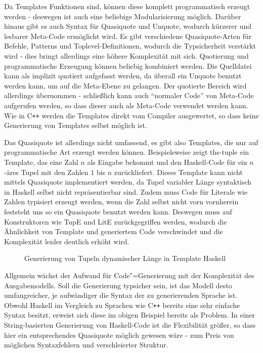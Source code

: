 \documentclass[11pt, a4paper, bibgerm]{book}
\newcommand\abb{}
\newcommand{\cgen}{Code"=Generierung}
\newcommand{\cpp}{C\texttt{++}}
\begin{document}
Da Templates Funktionen sind, können diese komplett programmatisch
erzeugt werden - deswegen ist auch eine beliebige Modularisierung
möglich. Darüber hinaus gibt es auch Syntax für Quasiquote und Unquote,
wodurch kürzerer und lesbarer Meta-Code ermöglicht wird. Es gibt
verschiedene Quasiquote-Arten für Befehle, Patterns und
Toplevel-Definitionen, wodurch die Typsicherheit verstärkt wird - dies
bringt allerdings eine höhere Komplexität mit sich. Quotierung und
programmatische Erzeugung können beliebig kombiniert werden. Die
Quelldatei kann als implizit quotiert aufgefasst werden, da überall ein
Unquote benutzt werden kann, um auf die Meta-Ebene zu gelangen. Der
quotierte Bereich wird allerdings übernommen - schließlich kann auch
"`normaler Code"' von Meta-Code aufgerufen werden, so dass dieser auch
als Meta-Code verwendet werden kann. Wie in \cpp{} werden die Templates
direkt vom Compiler ausgewertet, so dass keine Generierung von Templates
selbst möglich ist.

Das Quasiquote ist allerdings nicht umfassend, es gibt also Templates, die
nur auf programmatische Art erzeugt werden können. Beispielsweise zeigt
\abb{ths-tuple} ein Template, das eine Zahl $n$ als Eingabe bekommt und
den Haskell-Code für ein $n$-äres Tupel mit den Zahlen $1$ bis $n$
zurückliefert. Dieses Template kann nicht mittels Quasiquote implementiert
werden, da Tupel variabler Länge syntaktisch in Haskell selbst nicht
repräsentierbar sind. Zudem muss Code für Literale wie Zahlen typisiert
erzeugt werden, wenn die Zahl selbst nicht vorn vornherein feststeht uns
so ein Quasiquote benutzt werden kann. Deswegen muss auf Konstruktoren wie
TupE und LitE zurückgegriffen werden, wodurch die Ähnlichkeit von
Template und generiertem Code verschwindet und die Komplexität leider
deutlich erhöht wird.

\begin{figure}
  \centering
  \caption{Generierung von Tupeln dynamischer Länge in Template Haskell}
  \label{magicl:fig:ths-tuple}
\end{figure}

Allgemein wächst der Aufwand für \cgen{} mit der Komplexität des
Ausgabemodells. Soll die Generierung typsicher sein, ist das Modell
desto umfangreicher, je aufwändiger die Syntax der zu generierenden
Sprache ist. Obwohl Haskell im Vergleich zu Sprachen wie \cpp{} bereits
eine sehr einfache Syntax besitzt, erweist sich diese im obigen Beispiel
bereits als Problem. In einer String-basierten Generierung von
Haskell-Code ist die Flexibilität größer, so dass hier ein
entsprechendes Quasiquote möglich gewesen wäre - zum Preis von möglichen
Syntaxfehlern und verschleierter Struktur.
\end{document}

